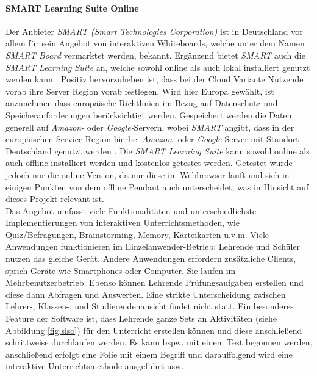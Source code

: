 \paragraph{SMART Learning Suite Online}
Der Anbieter \emph{SMART (Smart Technologies Corporation)} ist in Deutschland vor allem für sein Angebot von interaktiven Whiteboards, welche unter dem Namen \emph{SMART Board} vermarktet werden, bekannt. Ergänzend bietet \emph{SMART} auch die \emph{SMART Learning Suite} an, welche sowohl online als auch lokal installiert genutzt werden kann \cite{slso}. Positiv hervorzuheben ist, dass bei der Cloud Variante Nutzende vorab ihre Server Region vorab festlegen. Wird hier Europa gewählt, ist anzunehmen dass europäische Richtlinien im Bezug auf Datenschutz und Speicheranforderungen berücksichtigt werden. Gespeichert werden die Daten generell auf \emph{Amazon-} oder \emph{Google-}Servern, wobei \emph{SMART} angibt, dass in der europäischen Service Region hierbei \emph{Amazon-} oder \emph{Google-}Server mit Standort Deutschland genutzt werden \cite{Technologies2019}. Die \emph{SMART Learning Suite} kann sowohl online als auch offline installiert werden und kostenlos getestet werden. Getestet wurde jedoch nur die online Version, da nur diese im Webbrowser läuft und sich in einigen Punkten von dem offline Pendant auch unterscheidet, was in Hinsicht auf dieses Projekt relevant ist. \\ Das Angebot umfasst viele Funktionalitäten und unterschiedlichste Implementierungen von  interaktiven Unterrichtsmethoden, wie Quiz/Befragungen, Brainstorming, Memory, Karteikarten u.v.m. Viele Anwendungen funktionieren im Einzelanwender-Betrieb; Lehrende und Schüler nutzen das gleiche Gerät. Andere Anwendungen erfordern zusätzliche Clients, sprich Geräte wie Smartphones oder Computer. Sie laufen im Mehrbenutzerbetrieb. Ebenso können Lehrende Prüfungsaufgaben erstellen und diese dann Abfragen und Auswerten. Eine strikte Unterscheidung zwischen Lehrer-, Klassen-, und Studierendenansicht findet nicht statt. Ein besonderes Feature der Software ist, dass  Lehrende ganze Sets an Aktivitäten (siehe Abbildung \ref{fig:slso}) für den Unterricht erstellen können und diese anschließend schrittweise durchlaufen werden. Es kann bspw. mit einem Test begonnen werden, anschließend erfolgt eine Folie mit einem Begriff und darauffolgend wird eine interaktive Unterrichtsmethode ausgeführt usw. 

